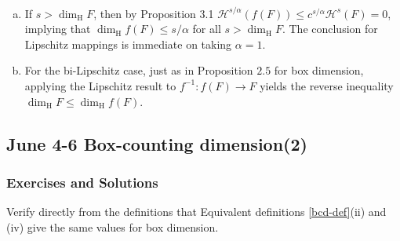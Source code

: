 \begin{customsol}{} $ $
    \begin{enumerate}[(a)]
        \item If $s>\operatorname{dim}_{\mathrm{H}} F$, then by Proposition 3.1 $\mathcal{H}^{s / \alpha}(f(F)) \leq c^{s / \alpha} \mathcal{H}^{s}(F)=0$,
        implying that $\operatorname{dim}_{\mathrm{H}} f(F) \leq s / \alpha$ for all $s>\operatorname{dim}_{\mathrm{H}} F$. The conclusion for
        Lipschitz mappings is immediate on taking $\alpha=1$.
        \item For the bi-Lipschitz case, just as in Proposition $2.5$ for box dimension, applying the Lipschitz result to $f^{-1}: f(F) \rightarrow F$ yields the reverse inequality $\operatorname{dim}_{\mathrm{H}} F \leq \operatorname{dim}_{\mathrm{H}} f(F)$.
    \end{enumerate}
\end{customsol}

\newpage

\subsection{June 4-6 Box-counting dimension(2)}
\subsubsection{Exercises and Solutions}

\begin{customexercise}{2.1}
    Verify directly from the definitions that Equivalent definitions \ref{bcd-def}(ii) and (iv) give the same values for box dimension.
\end{customexercise}

